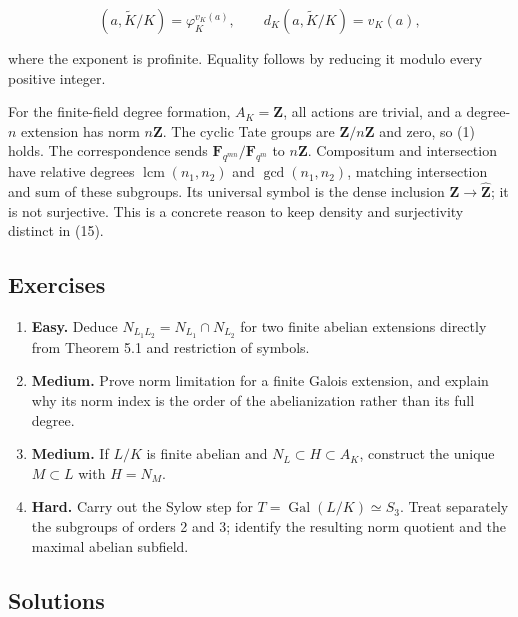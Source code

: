 \documentclass[11pt,a4paper]{article}
\newcommand{\tightlist}{\setlength{\itemsep}{0pt}\setlength{\parskip}{0pt}}
\begin{document}
\[
(a,\widetilde K/K)=\varphi_K^{v_K(a)},
\qquad d_K(a,\widetilde K/K)=v_K(a),
\tag{16}
\]

where the exponent is profinite. Equality follows by reducing it modulo
every positive integer.

For the finite-field degree formation, \(A_K=\mathbf Z\), all actions
are trivial, and a degree-\(n\) extension has norm \(n\mathbf Z\). The
cyclic Tate groups are \(\mathbf Z/n\mathbf Z\) and zero, so (1) holds.
The correspondence sends \(\mathbf F_{q^{mn}}/\mathbf F_{q^m}\) to
\(n\mathbf Z\). Compositum and intersection have relative degrees
\(\operatorname{lcm}(n_1,n_2)\) and \(\gcd(n_1,n_2)\), matching
intersection and sum of these subgroups. Its universal symbol is the
dense inclusion \(\mathbf Z\to\widehat{\mathbf Z}\); it is not
surjective. This is a concrete reason to keep density and surjectivity
distinct in (15).

\subsection{Exercises}\label{exercises}

\begin{enumerate}
\def\labelenumi{\arabic{enumi}.}
\tightlist
\item
  \textbf{Easy.} Deduce \(N_{L_1L_2}=N_{L_1}\cap N_{L_2}\) for two
  finite abelian extensions directly from Theorem 5.1 and restriction of
  symbols.
\item
  \textbf{Medium.} Prove norm limitation for a finite Galois extension,
  and explain why its norm index is the order of the abelianization
  rather than its full degree.
\item
  \textbf{Medium.} If \(L/K\) is finite abelian and
  \(N_L\subset H\subset A_K\), construct the unique \(M\subset L\) with
  \(H=N_M\).
\item
  \textbf{Hard.} Carry out the Sylow step for
  \(T=\operatorname{Gal}(L/K)\simeq S_3\). Treat separately the
  subgroups of orders 2 and 3; identify the resulting norm quotient and
  the maximal abelian subfield.
\end{enumerate}

\subsection{Solutions}\label{solutions}
\end{document}

